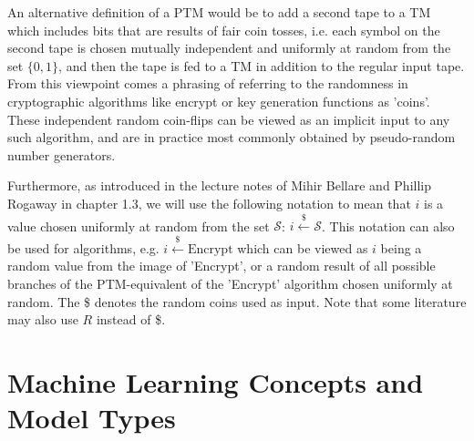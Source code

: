 An alternative definition of a PTM would be to add a second tape to a TM which includes bits that are results of fair coin tosses, i.e. each symbol on the second tape is chosen mutually independent and uniformly at random from the set $\{ 0, 1 \}$, and then the tape is fed to a TM in addition to the regular input tape. From this viewpoint comes a phrasing of referring to the randomness in cryptographic algorithms like encrypt or key generation functions as 'coins'. These independent random coin-flips can be viewed as an implicit input to any such algorithm, and are in practice most commonly obtained by pseudo-random number generators.

Furthermore, as introduced in the lecture notes of Mihir Bellare and Phillip Rogaway \cite{bellare_introduction_2005} in chapter 1.3, we will use the following notation to mean that $i$ is a value chosen uniformly at random from the set $\mathcal{S}$: $i \xleftarrow{\$} \mathcal{S}$. This notation can also be used for algorithms, e.g. $i \xleftarrow{\$} \text{Encrypt}$ which can be viewed as $i$ being a random value from the image of 'Encrypt', or a random result of all possible branches of the PTM-equivalent of the 'Encrypt' algorithm chosen uniformly at random. The \$ denotes the random coins used as input. Note that some literature may also use $R$ instead of \$.

\section{Machine Learning Concepts and Model Types}
